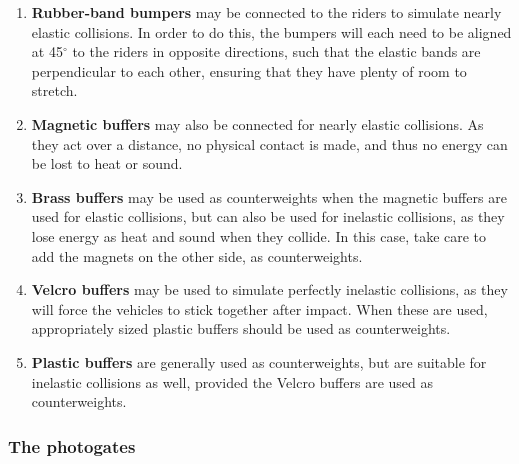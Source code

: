 \begin{enumerate}
    \item \textbf{Rubber-band bumpers} may be connected to the riders to simulate nearly elastic collisions. In order to do this, the bumpers will each need to be aligned at 45$^\circ$ to the riders in opposite directions, such that the elastic bands are perpendicular to each other, ensuring that they have plenty of room to stretch.
    
    \item \textbf{Magnetic buffers} may also be connected for nearly elastic collisions. As they act over a distance, no physical contact is made, and thus no energy can be lost to heat or sound.
    
    \item \textbf{Brass buffers} may be used as counterweights when the magnetic buffers are used for elastic collisions, but can also be used for inelastic collisions, as they lose energy as heat and sound when they collide. In this case, take care to add the magnets on the other side, as counterweights.
    
    \item \textbf{Velcro buffers} may be used to simulate perfectly inelastic collisions, as they will force the vehicles to stick together after impact. When these are used, appropriately sized plastic buffers should be used as counterweights.
    
    \item \textbf{Plastic buffers} are generally used as counterweights, but are suitable for inelastic collisions as well, provided the Velcro buffers are used as counterweights.
\end{enumerate}


\subsubsection*{The photogates}

